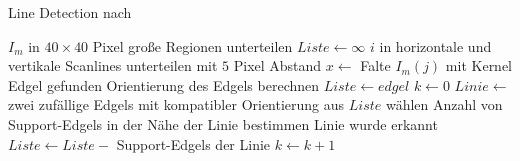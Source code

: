 \begin{algorithm}
	\caption{Line Detection nach \citeauthor{clarke96}}
	\label{src:lineDetection}
	\begin{algorithmic}[1]
		\State $I_m$ in $40 \times 40$ Pixel große Regionen unterteilen
			\State $Liste \gets \infty$
			\State $i$ in horizontale und vertikale Scanlines unterteilen mit $5$ Pixel Abstand
				\State $x \gets$ Falte $I_m\left(j\right)$ mit Kernel
					\Comment Edgel gefunden
					\State Orientierung des Edgels berechnen
					\State $Liste \gets edgel$
				\EndIf
			\EndFor
			\State $k \gets 0$
					\State $Linie \gets$ zwei zufällige Edgels mit kompatibler Orientierung aus $Liste$ wählen
					\State Anzahl von Support-Edgels in der Nähe der Linie bestimmen
				\EndFor
					\Comment Linie wurde erkannt
					\State $Liste \gets Liste -$ Support-Edgels der Linie
				\EndIf
				\State $k \gets k + 1$
			\EndWhile
		\EndFor
	\EndProcedure
	\end{algorithmic}
\end{algorithm}
